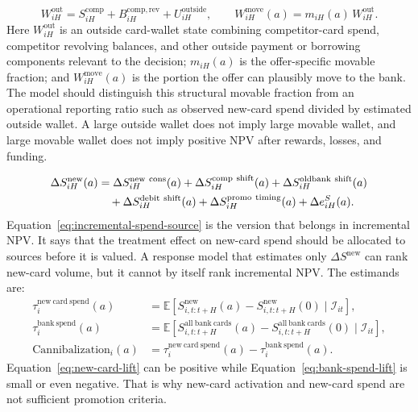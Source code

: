 \documentclass[11pt]{article}
\newcommand{\E}{\mathbb{E}}
\newcommand{\1}{\mathbf{1}}
\begin{document}
\begin{equation}
  W^{\mathrm{out}}_{iH}
  =
  S^{\mathrm{comp}}_{iH}
  + B^{\mathrm{comp,rev}}_{iH}
  + U^{\mathrm{outside}}_{iH},
  \qquad
  W^{\mathrm{move}}_{iH}(a)
  =
  m_{iH}(a)\,W^{\mathrm{out}}_{iH}.
  \label{eq:movable-card-wallet}
\end{equation}
Here $W^{\mathrm{out}}_{iH}$ is an outside card-wallet state combining
competitor-card spend, competitor revolving balances, and other outside payment
or borrowing components relevant to the decision; $m_{iH}(a)$ is the
offer-specific movable fraction; and $W^{\mathrm{move}}_{iH}(a)$ is the
portion the offer can plausibly move to the bank. The model should distinguish
this structural movable fraction from an operational reporting ratio such as
observed new-card spend divided by estimated outside wallet. A large outside
wallet does not imply large movable wallet, and large movable wallet does not
imply positive NPV after rewards, losses, and funding.

\begin{align}
  \Delta S^{\mathrm{new}}_{iH}(a)
  &=
  \Delta S^{\mathrm{new\ cons}}_{iH}(a)
  + \Delta S^{\mathrm{comp\ shift}}_{iH}(a)
  + \Delta S^{\mathrm{oldbank\ shift}}_{iH}(a)
  \notag\\
  &\quad
  + \Delta S^{\mathrm{debit\ shift}}_{iH}(a)
  + \Delta S^{\mathrm{promo\ timing}}_{iH}(a)
  + \Delta e^{S}_{iH}(a).
  \label{eq:incremental-spend-source}
\end{align}
Equation~\eqref{eq:incremental-spend-source} is the version that belongs in
incremental NPV. It says that the treatment effect on new-card spend should be
allocated to sources before it is valued. A response model that estimates only
$\Delta S^{\mathrm{new}}$ can rank new-card volume, but it cannot by itself
rank incremental NPV. The estimands are:
\begin{align}
  \tau_i^{\mathrm{new\ card\ spend}}(a)
    &=
    \E[S^{\mathrm{new}}_{i,t:t+H}(a)
      - S^{\mathrm{new}}_{i,t:t+H}(0)\mid \mathcal{I}_{it}],
      \label{eq:new-card-lift}\\
  \tau_i^{\mathrm{bank\ spend}}(a)
    &=
    \E[S^{\mathrm{all\ bank\ cards}}_{i,t:t+H}(a)
      - S^{\mathrm{all\ bank\ cards}}_{i,t:t+H}(0)\mid \mathcal{I}_{it}],
      \label{eq:bank-spend-lift}\\
  \mathrm{Cannibalization}_i(a)
    &=
    \tau_i^{\mathrm{new\ card\ spend}}(a)
      - \tau_i^{\mathrm{bank\ spend}}(a).
      \label{eq:cannibalization}
\end{align}
Equation~\eqref{eq:new-card-lift} can be positive while
Equation~\eqref{eq:bank-spend-lift} is small or even negative. That is why
new-card activation and new-card spend are not sufficient promotion criteria.
\end{document}
